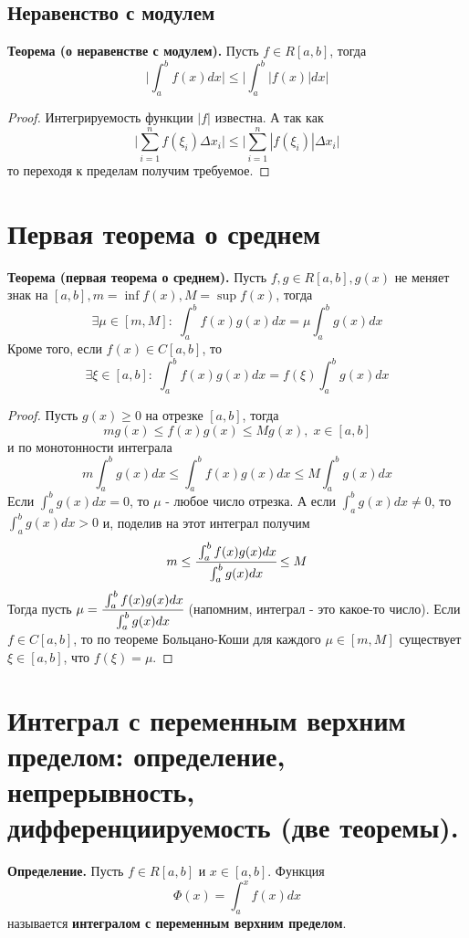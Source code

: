 \documentclass{article}
\newcommand*{\theorem}[2]{\textbf{Теорема #1. } #2 \newline}
\newcommand*{\definition}[1]{\textbf{Определение.} #1 \newline}
\begin{document}
\subsection{Неравенство с модулем}
\theorem{(о неравенстве с модулем)}{Пусть $f \in R[a, b]$, тогда}
$$
    \Biggl| \int_{a}^{b} f(x)dx \Biggr| \leq \Biggl| \int_{a}^{b}|f(x)|dx \Biggr| 
$$
\begin{proof}
    Интегрируемость функции $|f|$ известна. А так как 
    $$
        \Biggl| \sum_{i = 1}^{n} f(\xi_i)\Delta x_i \Biggr| \leq \Biggl| \sum_{i = 1}^{n}|f(\xi_i)|\Delta x_i \Biggr|
    $$
    то переходя к пределам получим требуемое.
\end{proof}
\section{Первая теорема о среднем}
\theorem{(первая теорема о среднем)}{Пусть $f, g \in R[a, b], g(x)$ не меняет знак на $[a, b], m = \inf f(x), M = \sup f(x)$, тогда}
$$
    \exists \mu \in [m, M]: \; \int_{a}^{b} f(x)g(x)dx = \mu\int_{a}^{b} g(x)dx
$$
Кроме того, если $f(x) \in C[a, b]$, то
$$
    \exists \xi \in [a, b]: \; \int_{a}^{b}f(x)g(x)dx = f(\xi)\int_{a}^{b}g(x)dx
$$
\begin{proof}
    Пусть $g(x) \geq 0$ на отрезке $[a, b]$, тогда
    $$
        mg(x) \leq f(x)g(x) \leq Mg(x), \; x \in [a, b]
    $$
    и по монотонности интеграла
    $$
        m\int_{a}^{b}g(x)dx \leq \int_{a}^{b}f(x)g(x)dx \leq M\int_{a}^{b}g(x)dx
    $$
    Если $\int_{a}^{b} g(x)dx = 0$, то $\mu$ - любое число отрезка. А если $\int_{a}^{b}g(x)dx \neq 0$, то $\int_{a}^{b} g(x)dx > 0$ и, поделив на этот интеграл получим
    $$
        m \leq \cfrac{\int_{a}^{b}f(x)g(x)dx}{\int_{a}^{b}g(x)dx} \leq M
    $$
    Тогда пусть $\mu = \cfrac{\int_{a}^{b}f(x)g(x)dx}{\int_{a}^{b}g(x)dx}$ (напомним, интеграл - это какое-то число). 
    \newline \newline 
    Если $f \in C[a, b]$, то по теореме Больцано-Коши для каждого $\mu \in [m, M]$ существует $\xi \in [a, b]$, что $f(\xi) = \mu$.
\end{proof}
\section{Интеграл с переменным верхним пределом: определение, непрерывность, дифференциируемость (две теоремы).}
\definition{Пусть $f \in R[a, b]$ и $x \in [a, b]$. Функция}
$$
    \Phi(x) = \int_{a}^{x} f(x)dx
$$
называется \textbf{интегралом с переменным верхним пределом}.
\end{document}
